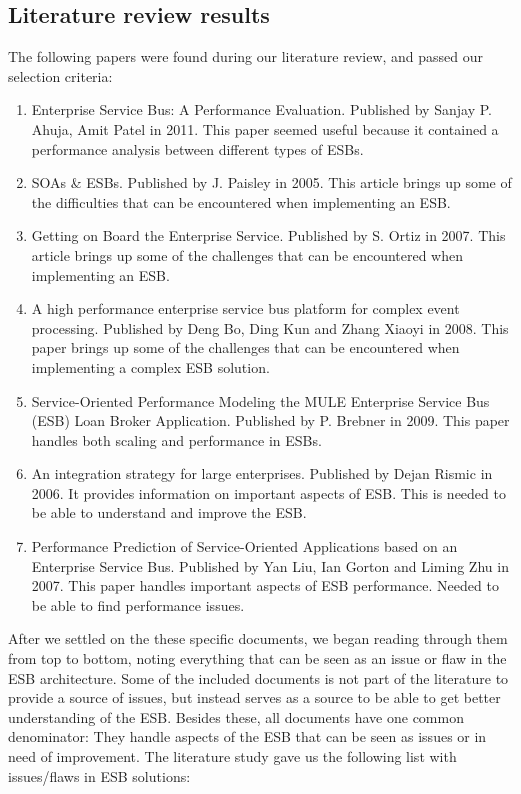 \documentclass{llncs}
\begin{document}
\subsection{Literature review results}

The following papers were found during our literature review, and passed our selection criteria:
\begin{enumerate}
\item Enterprise Service Bus: A Performance Evaluation\cite{sanjay11}. Published by Sanjay P. Ahuja, Amit Patel in 2011. This paper seemed useful because it contained a performance analysis between different types of ESBs.
\item SOAs \& ESBs\cite{paisley05}. Published by J. Paisley in 2005. This article brings up some of the difficulties that can be encountered when implementing an ESB.
\item Getting on Board the Enterprise Service\cite{ortiz07}. Published by S. Ortiz in 2007. This article brings up some of the challenges that can be encountered when implementing an ESB.
\item A high performance enterprise service bus platform for complex event processing\cite{bo08}. Published by Deng Bo,  Ding Kun and Zhang Xiaoyi in 2008. This paper brings up some of the challenges that can be encountered when implementing a complex ESB solution.
\item Service-Oriented Performance Modeling the MULE Enterprise Service Bus (ESB) Loan Broker Application\cite{brebner09}. Published by P. Brebner in 2009. This paper handles both scaling and performance in ESBs.
\item An integration strategy for large enterprises\cite{risimic06}. Published by Dejan Rismic in 2006. It provides information on important aspects of ESB. This is needed to be able to understand and improve the ESB.
\item Performance Prediction of Service-Oriented Applications based on an Enterprise Service Bus\cite{gorton07}. Published by Yan Liu, Ian Gorton and Liming Zhu in 2007. This paper handles important aspects of ESB performance. Needed to be able to find performance issues.
\end{enumerate}

After we settled on the these specific documents, we began reading through them from top to bottom, noting everything that can be seen as an issue or flaw in the ESB architecture.
Some of the included documents is not part of the literature to provide a source of issues, but instead serves as a source to be able to get better understanding of the ESB.
Besides these, all documents have one common denominator: They handle aspects of the ESB that can be seen as issues or in need of improvement.
The literature study gave us the following list with issues/flaws in ESB solutions:
\end{document}
